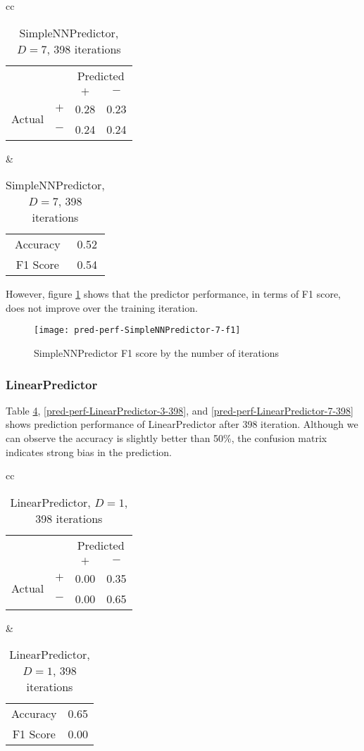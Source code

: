 \documentclass[twocolumn,10pt]{asme2ej}
\begin{document}
\begin{table}
  \begin{tabular}{cc}
    \begin{tabular}{cc|cc}
      & & \multicolumn{2}{c}{Predicted} \\
      & & $+ $ & $-$ \\
      \hline
      \multirow{2}{*}{Actual}
      & $+$ & 0.28 & 0.23 \\
      & $-$ & 0.24 & 0.24 \\
      \hline
    \end{tabular}
    &
    \begin{tabular}{cc}
      Accuracy & 0.52 \\
      F1 Score & 0.54 \\
    \end{tabular}
  \end{tabular}
  \caption{SimpleNNPredictor, $D=7$, 398 iterations}
  \label{pred-perf-SimpleNNPredictor-7-398}
\end{table}


However, figure \ref{pred-perf-SimpleNNPredictor-7-f1} shows that the predictor
performance, in terms of F1 score, does not improve over the training
iteration. 

\begin{figure}
  \centering
  \texttt{[image: pred-perf-SimpleNNPredictor-7-f1]}
  \caption{SimpleNNPredictor F1 score by the number of iterations}
  \label{pred-perf-SimpleNNPredictor-7-f1}
\end{figure}

\subsubsection{LinearPredictor}

Table \ref{pred-perf-LinearPredictor-1-398},
\ref{pred-perf-LinearPredictor-3-398}, and
\ref{pred-perf-LinearPredictor-7-398} shows prediction performance of
LinearPredictor after 398 iteration. Although we can observe the
accuracy is slightly better than 50\%, the confusion matrix indicates
strong bias in the prediction.

\begin{table}
  \begin{tabular}{cc}
    \begin{tabular}{cc|cc}
      & & \multicolumn{2}{c}{Predicted} \\
      & & $+ $ & $-$ \\
      \hline
      \multirow{2}{*}{Actual}
      & $+$ & 0.00 & 0.35 \\
      & $-$ & 0.00 & 0.65 \\
      \hline
    \end{tabular}
    &
    \begin{tabular}{cc}
      Accuracy & 0.65 \\
      F1 Score & 0.00 \\
    \end{tabular}
  \end{tabular}
  \caption{LinearPredictor, $D=1$, 398 iterations}
  \label{pred-perf-LinearPredictor-1-398}
\end{table}
\end{document}
